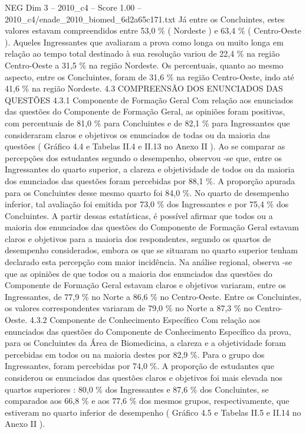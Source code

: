 \begin{textsample}{NEG Dim 3 – 2010\_c4 – Score 1.00 – 2010\_c4/enade\_2010\_biomed\_6d2a65c171.txt}
Já entre os Concluintes, estes valores estavam compreendidos entre 53,0 \% ( Nordeste ) e 63,4 \% ( Centro-Oeste ).
Aqueles Ingressantes que avaliaram a prova como longa ou muito longa em relação ao tempo total destinado à sua resolução variou de 22,4 \% na região Centro-Oeste a 31,5 \% na região Nordeste.
Os percentuais, quanto ao mesmo aspecto, entre os Concluintes, foram de 31,6 \% na região Centro-Oeste, indo até 41,6 \% na região Nordeste. 4.3 COMPREENSÃO DOS ENUNCIADOS DAS QUESTÕES 4.3.1 Componente de Formação Geral Com relação aos enunciados das questões do Componente de Formação Geral, as opiniões foram positivas, com percentuais de 81,0 \% para Concluintes e de 82,1 \% para Ingressantes que consideraram claros e objetivos os enunciados de todas ou da maioria das questões ( Gráfico 4.4 e Tabelas II.4 e II.13 no Anexo II ).
Ao se comparar as percepções dos estudantes segundo o desempenho, observou -se que, entre os Ingressantes do quarto superior, a clareza e objetividade de todos ou da maioria dos enunciados das questões foram percebidas por 88,1 \%.
A proporção apurada para os Concluintes desse mesmo quarto foi 84,0 \%.
No quarto de desempenho inferior, tal avaliação foi emitida por 73,0 \% dos Ingressantes e por 75,4 \% dos Concluintes.
A partir dessas estatísticas, é possível afirmar que todos ou a maioria dos enunciados das questões do Componente de Formação Geral estavam claros e objetivos para a maioria dos respondentes, segundo os quartos de desempenho considerados, embora os que se situaram no quarto superior tenham declarado esta percepção com maior incidência.
Na análise regional, observa -se que as opiniões de que todos ou a maioria dos enunciados das questões do Componente de Formação Geral estavam claros e objetivos variaram, entre os Ingressantes, de 77,9 \% no Norte a 86,6 \% no Centro-Oeste.
Entre os Concluintes, os valores correspondentes variaram de 79,0 \% no Norte a 87,3 \% no Centro-Oeste. 4.3.2 Componente de Conhecimento Específico Com relação aos enunciados das questões do Componente de Conhecimento Específico da prova, para os Concluintes da Área de Biomedicina, a clareza e a objetividade foram percebidas em todos ou na maioria destes por 82,9 \%.
Para o grupo dos Ingressantes, foram percebidas por 74,0 \%.
A proporção de estudantes que considerou os enunciados das questões claros e objetivos foi mais elevada nos quartos superiores : 80,0 \% dos Ingressantes e 87,6 \% dos Concluintes, se comparados aos 66,8 \% e aos 77,6 \% dos mesmos grupos, respectivamente, que estiveram no quarto inferior de desempenho ( Gráfico 4.5 e Tabelas II.5 e II.14 no Anexo II ).

\end{textsample}

